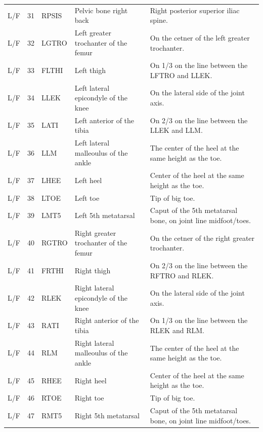 \documentclass[fleqn,10pt]{wlpeerj}
\begin{document}
\begin{table}
\begin{tabular}{lrlll}
    L/F & 31 & RPSIS & Pelvic bone right back                & Right posterior superior iliac spine. \\
    L/F & 32 & LGTRO & Left greater trochanter of the femur  & On the cetner of the left greater trochanter. \\
    L/F & 33 & FLTHI & Left thigh                            & On 1/3 on the line between the LFTRO and LLEK. \\
    L/F & 34 & LLEK  & Left lateral epicondyle of the knee   & On the lateral side of the joint axis. \\
    L/F & 35 & LATI  & Left anterior of the tibia            & On 2/3 on the line between the LLEK and LLM. \\
    L/F & 36 & LLM   & Left lateral malleoulus of the ankle  & The center of the heel at the same height as the toe. \\
    L/F & 37 & LHEE  & Left heel                             & Center of the heel at the same height as the toe. \\
    L/F & 38 & LTOE  & Left toe                              & Tip of big toe. \\
    L/F & 39 & LMT5  & Left 5th metatarsal                   & Caput of the 5th metatarsal bone, on joint line midfoot/toes. \\
    L/F & 40 & RGTRO & Right greater trochanter of the femur & On the cetner of the right greater trochanter. \\
    L/F & 41 & FRTHI & Right thigh                           & On 2/3 on the line between the RFTRO and RLEK. \\
    L/F & 42 & RLEK  & Right lateral epicondyle of the knee  & On the lateral side of the joint axis. \\
    L/F & 43 & RATI  & Right anterior of the tibia           & On 1/3 on the line between the RLEK and RLM. \\
    L/F & 44 & RLM   & Right lateral malleoulus of the ankle & The center of the heel at the same height as the toe. \\
    L/F & 45 & RHEE  & Right heel                            & Center of the heel at the same height as the toe. \\
    L/F & 46 & RTOE  & Right toe                             & Tip of big toe. \\
    L/F & 47 & RMT5  & Right 5th metatarsal                  & Caput of the 5th metatarsal bone, on joint line midfoot/toes. \\
    \bottomrule
  \end{tabular}
  \label{tab:marker-labels}
\end{table}
\end{document}
